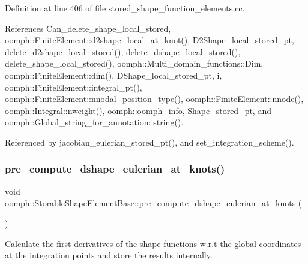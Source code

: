 Definition at line 406 of file stored\+\_\+shape\+\_\+function\+\_\+elements.\+cc.



References Can\+\_\+delete\+\_\+shape\+\_\+local\+\_\+stored, oomph\+::\+Finite\+Element\+::d2shape\+\_\+local\+\_\+at\+\_\+knot(), D2\+Shape\+\_\+local\+\_\+stored\+\_\+pt, delete\+\_\+d2shape\+\_\+local\+\_\+stored(), delete\+\_\+dshape\+\_\+local\+\_\+stored(), delete\+\_\+shape\+\_\+local\+\_\+stored(), oomph\+::\+Multi\+\_\+domain\+\_\+functions\+::\+Dim, oomph\+::\+Finite\+Element\+::dim(), D\+Shape\+\_\+local\+\_\+stored\+\_\+pt, i, oomph\+::\+Finite\+Element\+::integral\+\_\+pt(), oomph\+::\+Finite\+Element\+::nnodal\+\_\+position\+\_\+type(), oomph\+::\+Finite\+Element\+::nnode(), oomph\+::\+Integral\+::nweight(), oomph\+::oomph\+\_\+info, Shape\+\_\+stored\+\_\+pt, and oomph\+::\+Global\+\_\+string\+\_\+for\+\_\+annotation\+::string().



Referenced by jacobian\+\_\+eulerian\+\_\+stored\+\_\+pt(), and set\+\_\+integration\+\_\+scheme().

\mbox{\label{classoomph_1_1StorableShapeElementBase_a9e936c1ce294614fab6db0ab864d9949}} 
\subsubsection{\texorpdfstring{pre\+\_\+compute\+\_\+dshape\+\_\+eulerian\+\_\+at\+\_\+knots()}{pre\_compute\_dshape\_eulerian\_at\_knots()}}
{\footnotesize\ttfamily void oomph\+::\+Storable\+Shape\+Element\+Base\+::pre\+\_\+compute\+\_\+dshape\+\_\+eulerian\+\_\+at\+\_\+knots (\begin{DoxyParamCaption}{ }\end{DoxyParamCaption})}



Calculate the first derivatives of the shape functions w.\+r.\+t the global coordinates at the integration points and store the results internally. 

